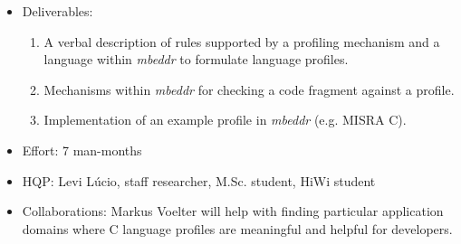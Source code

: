 \begin{itemize}
  \item Deliverables:
  \begin{enumerate}
    \item A verbal description of rules supported by a profiling mechanism and a
    language within \emph{mbeddr} to formulate language profiles.
    \item Mechanisms within \emph{mbeddr} for checking a code fragment against a
    profile.
    \item Implementation of an example profile in \emph{mbeddr} (e.g. MISRA
    C).
  \end{enumerate}
  \item Effort: 7 man-months
  \item HQP: Levi L\'ucio, staff researcher, M.Sc. student, HiWi student 
  \item Collaborations: Markus Voelter will help with finding
  particular application domains where C language profiles are meaningful and
  helpful for developers.
\end{itemize}

